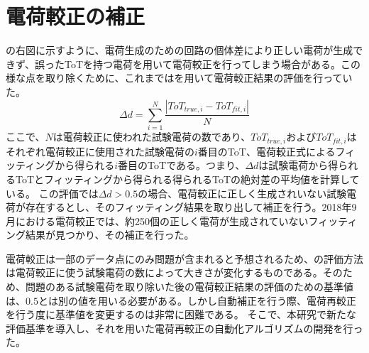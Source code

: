 \section{電荷較正の補正}
\label{sec:calibhosei}
の右図に示すように、電荷生成のための回路の個体差により正しい電荷が生成できず、誤ったToTを持つ電荷を用いて電荷較正を行ってしまう場合がある。この様な点を取り除くために、これまではを用いて電荷較正結果の評価を行っていた。
\begin{equation}
  \label{eq:averagedistance}
  \Delta d = \sum_{i=1}^{N} \frac{|ToT_{true, i} - ToT_{fit, i}|}{N}
\end{equation}
ここで、$N$は電荷較正に使われた試験電荷の数であり、$ToT_{true, i}$および$ToT_{fit, i}$はそれぞれ電荷較正に使用された試験電荷の$i$番目のToT、電荷較正式によるフィッティングから得られる$i$番目のToTである。つまり、$\Delta d$は試験電荷から得られるToTとフィッティングから得られる得られるToTの絶対差の平均値を計算している。
この評価では$\Delta d > 0.5$の場合、電荷較正に正しく生成されいない試験電荷が存在するとし、そのフィッティング結果を取り出して補正を行う。2018年9月における電荷較正では、約250個の正しく電荷が生成されていないフィッティング結果が見つかり、その補正を行った。


電荷較正は一部のデータ点にのみ問題が含まれると予想されるため、の評価方法は電荷較正に使う試験電荷の数によって大きさが変化するものである。そのため、問題のある試験電荷を取り除いた後の電荷較正結果の評価のための基準値は、$0.5$とは別の値を用いる必要がある。しかし自動補正を行う際、電荷再較正を行う度に基準値を変更するのは非常に困難である。
そこで、本研究で新たな評価基準を導入し、それを用いた電荷再較正の自動化アルゴリズムの開発を行った。


